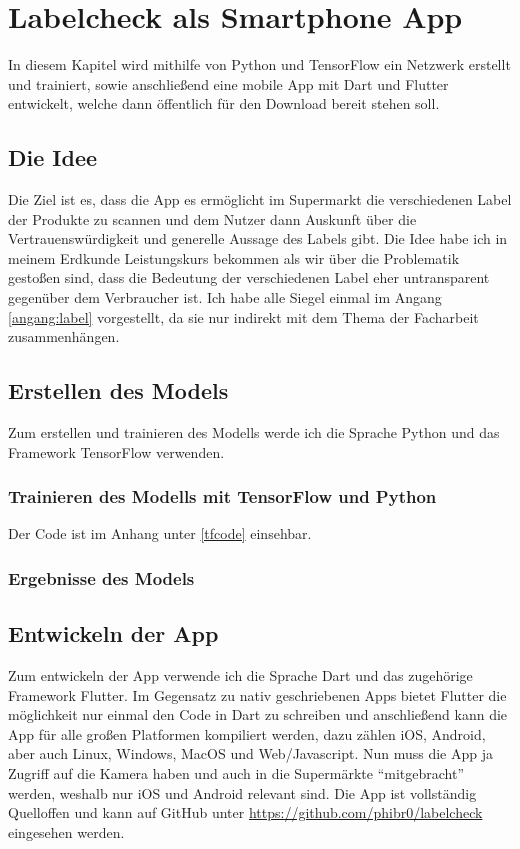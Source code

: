 \section{Labelcheck als Smartphone App}\label{labelcheck}

In diesem Kapitel wird mithilfe von Python und TensorFlow ein Netzwerk erstellt und trainiert, sowie anschließend eine mobile App mit Dart und Flutter entwickelt, welche dann öffentlich für den Download bereit stehen soll.

\subsection{Die Idee}

Die Ziel ist es, dass die App es ermöglicht im Supermarkt die verschiedenen Label der Produkte zu scannen und dem Nutzer dann Auskunft über die Vertrauenswürdigkeit und generelle Aussage des Labels gibt. Die Idee habe ich in meinem Erdkunde Leistungskurs bekommen als wir über die Problematik gestoßen sind, dass die Bedeutung der verschiedenen Label eher untransparent gegenüber dem Verbraucher ist. Ich habe alle Siegel einmal im Angang \ref{angang:label} vorgestellt, da sie nur indirekt mit dem Thema der Facharbeit zusammenhängen.

\subsection{Erstellen des Models}\label{erstellen des modells}

Zum erstellen und trainieren des Modells werde ich die Sprache Python und das Framework TensorFlow verwenden.

\subsubsection{Trainieren des Modells mit TensorFlow und Python}

Der Code ist im Anhang unter \ref{tfcode} einsehbar.

\subsubsection{Ergebnisse des Models}

\subsection{Entwickeln der App}

Zum entwickeln der App verwende ich die Sprache Dart und das zugehörige Framework Flutter. Im Gegensatz zu nativ geschriebenen Apps bietet Flutter die möglichkeit nur einmal den Code in Dart zu schreiben und anschließend kann die App für alle großen Platformen kompiliert werden, dazu zählen iOS, Android, aber auch Linux, Windows, MacOS und Web/Javascript. Nun muss die App ja Zugriff auf die Kamera haben und auch in die Supermärkte "`mitgebracht"' werden, weshalb nur iOS und Android relevant sind. Die App ist vollständig Quelloffen und kann auf GitHub unter \url{https://github.com/phibr0/labelcheck} eingesehen werden.

